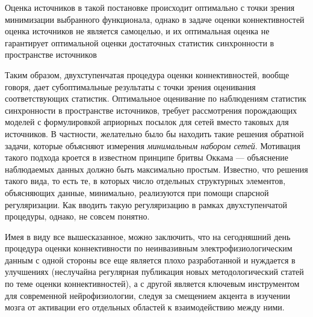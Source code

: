 Оценка источников в такой постановке происходит оптимально с точки зрения минимизации
выбранного функционала, однако в задаче оценки коннективностей оценка источников не
является самоцелью, и их оптимальная оценка не гарантирует оптимальной оценки
достаточных статистик синхронности в пространстве источников

Таким образом, двухступенчатая процедура оценки коннективностей, вообще говоря,
дает субоптимальные результаты с точки зрения оценивания соответствующих статистик.
Оптимальное оценивание по наблюдениям статистик синхронности в пространстве источников, требует
рассмотрения порождающих моделей с формулировкой априорных посылок для сетей вместо таковых для
источников. В частности, желательно было бы находить такие решения обратной задачи, которые
объясняют измерения \emph{минимальным набором сетей}. Мотивация такого подхода кроется в известном
принципе бритвы Оккама --- объяснение наблюдаемых данных должно быть максимально простым.
Известно, что решения такого вида, то есть те, в которых число отдельных структурных элементов,
объясняющих данные, минимально, реализуются при помощи спарсной регуляризации.
Как вводить такую регуляризацию в рамках двухступенчатой процедуры, однако, не совсем
понятно.




Имея в виду все вышесказанное, можно заключить, что на сегодняшний день
процедура оценки коннективности по неинвазивным электрофизиологическим данным с одной стороны
все еще является плохо разработанной и нуждается в улучшениях (неслучайна
регулярная публикация новых методологический статей по теме оценки коннективностей),
а с другой является ключевым инструментом для современной нейрофизиологии,
следуя за смещением акцента в изучении мозга от активации его отдельных областей к взаимодействию 
между ними.

